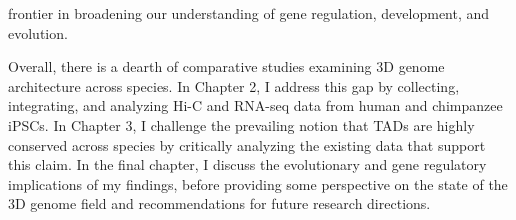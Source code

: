 frontier in broadening our understanding of gene regulation, development, and evolution.

Overall, there is a dearth of comparative studies examining 3D genome architecture across species. In Chapter 2, I address this gap by collecting, integrating, and analyzing Hi-C and RNA-seq data from human and chimpanzee iPSCs. In Chapter 3, I challenge the prevailing notion that TADs are highly conserved across species by critically analyzing the existing data that support this claim. In the final chapter, I discuss the evolutionary and gene regulatory implications of my findings, before providing some perspective on the state of the 3D genome field and recommendations for future research directions.